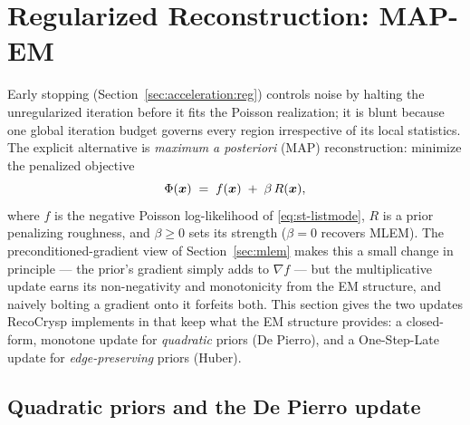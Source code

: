 \section{Regularized Reconstruction: MAP-EM}
\label{sec:regularization}

Early stopping (Section~\ref{sec:acceleration:reg}) controls noise by halting the
unregularized iteration before it fits the Poisson realization; it is blunt
because one global iteration budget governs every region irrespective of its
local statistics. The explicit alternative is \emph{maximum a posteriori} (MAP)
reconstruction: minimize the penalized objective
\begin{equation}
  \Phi(\bm{x}) \;=\; f(\bm{x}) \;+\; \beta\,R(\bm{x}),
  \label{eq:reg-map}
\end{equation}
where $f$ is the negative Poisson log-likelihood of \eqref{eq:st-listmode}, $R$ is
a prior penalizing roughness, and $\beta\ge0$ sets its strength ($\beta=0$
recovers MLEM). The preconditioned-gradient view of Section~\ref{sec:mlem} makes
this a small change in principle --- the prior's gradient simply adds to
$\nabla f$ --- but the multiplicative update earns its non-negativity and
monotonicity from the EM structure, and naively bolting a gradient onto it forfeits
both. This section gives the two updates RecoCrysp implements in
 that keep what the EM structure provides: a closed-form,
monotone update for \emph{quadratic} priors (De Pierro), and a One-Step-Late update
for \emph{edge-preserving} priors (Huber).

\subsection{Quadratic priors and the De Pierro update}
\label{sec:reg:depierro}


